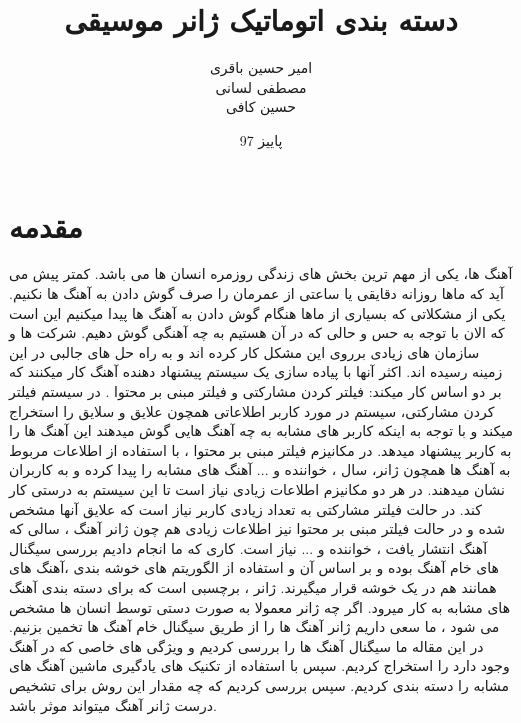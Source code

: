 \documentclass[conference]{IEEEtran}
\title{دسته بندی اتوماتیک ژانر موسیقی   }
\author{
امیر حسین باقری\\
مصطفی لسانی\\
حسین کافی
}
\date{پاییز 97}
\begin{document}
\maketitle

\section{مقدمه} 
آهنگ ها، یکی از مهم ترین بخش های زندگی روزمره انسان ها می باشد. کمتر پیش می آید که ماها روزانه دقایقی یا ساعتی از عمرمان را صرف گوش دادن به آهنگ ها نکنیم. یکی از مشکلاتی که بسیاری از ماها هنگام گوش دادن به آهنگ ها پیدا میکنیم این است که الان با توجه به حس و حالی که در آن هستیم به چه آهنگی گوش دهیم.
شرکت ها و سازمان های زیادی برروی این مشکل کار کرده اند و به راه حل های جالبی در این زمینه رسیده اند. اکثر آنها با پیاده سازی یک سیستم پیشنهاد دهنده آهنگ کار میکنند که بر دو اساس کار میکند: فیلتر کردن مشارکتی    و  فیلتر مبنی بر محتوا  . در سیستم فیلتر کردن مشارکتی، سیستم در مورد کاربر اطلاعاتی همچون علایق و سلایق را استخراج میکند و با توجه به اینکه کاربر های مشابه به چه آهنگ هایی گوش میدهند این آهنگ ها را به کاربر پیشنهاد میدهد. در مکانیزم فیلتر مبنی بر محتوا ، با استفاده از اطلاعات مربوط به آهنگ ها همچون ژانر، سال ، خواننده و ... آهنگ های مشابه را پیدا کرده و به کاربران نشان میدهند. در هر دو مکانیزم اطلاعات زیادی نیاز است تا این سیستم به درستی کار کند. در حالت فیلتر مشارکتی به تعداد زیادی کاربر نیاز است که علایق آنها مشخص شده و در حالت فیلتر مبنی بر محتوا نیز اطلاعات زیادی هم چون ژانر آهنگ ، سالی که آهنگ انتشار یافت ، خواننده و ... نیاز است. کاری که ما انجام دادیم بررسی سیگنال های خام آهنگ بوده و بر اساس آن و استفاده از الگوریتم های خوشه بندی ،آهنگ های همانند هم در یک خوشه قرار میگیرند. 
ژانر ، برچسبی است که برای دسته بندی آهنگ های مشابه به کار میرود. اگر چه ژانر معمولا به صورت دستی توسط انسان ها مشخص می شود ، ما سعی داریم ژانر آهنگ ها را از طریق سیگنال خام آهنگ ها تخمین بزنیم. در این مقاله ما سیگنال آهنگ ها را بررسی کردیم و ویژگی های خاصی که در آهنگ وجود دارد را استخراج کردیم. سپس با استفاده از تکنیک های یادگیری ماشین آهنگ های مشابه را دسته بندی کردیم. سپس بررسی کردیم که چه مقدار این روش برای تشخیص درست ژانر آهنگ میتواند موثر باشد.
\end{document}
